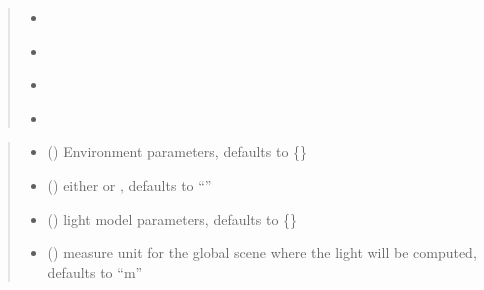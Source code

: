 \documentclass[letterpaper,10pt,english]{sphinxmanual}
\begin{document}
\begin{fulllineitems}
\begin{quote}
\begin{itemize}
\item {} 
\sphinxAtStartPar
{\hyperref[\detokenize{reference:LVM.LightVegeManager.legume_empty_layers}]{}}

\item {} 
\sphinxAtStartPar
{\hyperref[\detokenize{reference:LVM.LightVegeManager.tesselationtime}]{}}

\item {} 
\sphinxAtStartPar
{\hyperref[\detokenize{reference:LVM.LightVegeManager.modelruntime}]{}}

\item {} 
\sphinxAtStartPar
{\hyperref[\detokenize{reference:LVM.LightVegeManager.leafangledistribution}]{}}

\end{itemize}
\end{quote}
\begin{quote}\begin{description}
\begin{itemize}
\item {} 
\sphinxAtStartPar
{} (\sphinxstyleliteralemphasis{\sphinxupquote{, }}) \textendash{} Environment parameters, defaults to \{\}

\item {} 
\sphinxAtStartPar
{} (\sphinxstyleliteralemphasis{\sphinxupquote{, }}) \textendash{} either  or , defaults to “”

\item {} 
\sphinxAtStartPar
{} (\sphinxstyleliteralemphasis{\sphinxupquote{, }}) \textendash{} light model parameters, defaults to \{\}

\item {} 
\sphinxAtStartPar
{} (\sphinxstyleliteralemphasis{\sphinxupquote{, }}) \textendash{} measure unit for the global scene where the light will be computed, defaults to “m”


\end{itemize}
\end{description}
\end{quote}
\end{fulllineitems}
\end{document}
